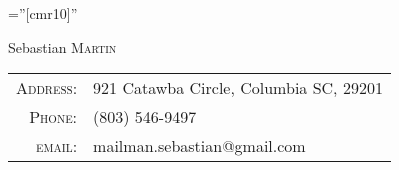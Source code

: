 \documentclass[a4paper,10pt]{article}
\begin{document}

\pagestyle{empty} %

\font\fb=''[cmr10]'' %

\par{\centering
		{\Huge Sebastian \textsc{Martin}
	}\bigskip\par}

\begin{center}
	\begin{tabular}{r|l}
    \textsc{Address:}   & 921 Catawba Circle, Columbia SC, 29201\\
    \textsc{Phone:}     & (803) 546-9497\\
    \textsc{email:}     & {mailman.sebastian@gmail.com}
\end{tabular}
\end{center}


\end{document}

